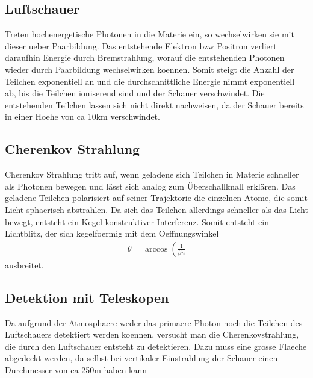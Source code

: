 \subsection{Luftschauer}
Treten hochenergetische Photonen in die Materie ein, so wechselwirken sie mit dieser ueber Paarbildung. Das entstehende Elektron bzw Positron verliert daraufhin Energie durch Bremstrahlung, worauf die entstehenden Photonen wieder durch Paarbildung wechselwirken koennen. Somit steigt die Anzahl der Teilchen exponentiell an und die durchschnittliche Energie nimmt exponentiell ab, bis die Teilchen ioniserend sind und der Schauer verschwindet. Die entstehenden Teilchen lassen sich nicht direkt nachweisen, da der Schauer bereits in einer Hoehe von ca 10km verschwindet. %

\subsection{Cherenkov Strahlung}
Cherenkov Strahlung tritt auf, wenn geladene sich Teilchen in Materie schneller als Photonen bewegen und lässt sich analog zum Überschallknall erklären. Das geladene Teilchen polarisiert auf seiner Trajektorie die einzelnen Atome, die somit Licht sphaerisch abstrahlen. Da sich das Teilchen allerdings schneller als das Licht bewegt, entsteht ein Kegel konstruktiver Interferenz. Somit entsteht ein Lichtblitz, der sich kegelfoermig mit dem Oeffnungswinkel %
\begin{align}
\theta = \arccos\left(\frac{1}{\beta n}
\end{align}
ausbreitet.

\subsection{Detektion mit Teleskopen}
Da aufgrund der Atmosphaere weder das primaere Photon noch die Teilchen des Luftschauers detektiert werden koennen, versucht man die Cherenkovstrahlung, die durch den Luftschauer entsteht zu detektieren. Dazu muss eine grosse Flaeche abgedeckt werden, da selbst bei vertikaler Einstrahlung der Schauer einen Durchmesser von ca 250m haben kann %
